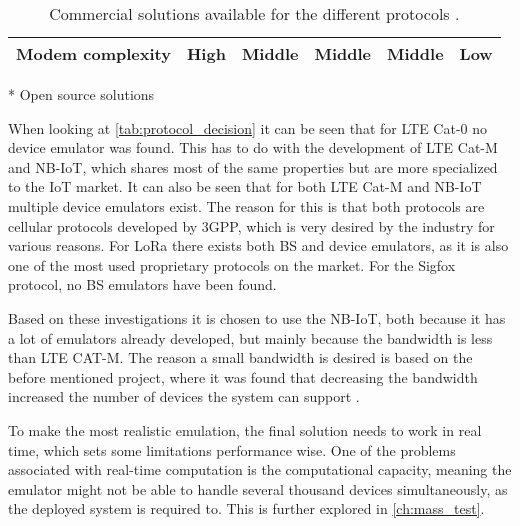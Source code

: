 \begin{table}[H]
{\begin{tabular}{|c|c|c|c|c|c|}
Modem complexity    & High                 & Middle                 & Middle             & Middle         & Low                \\ \hline
\end{tabular}}
\raggedright \scriptsize{ * Open source solutions} 
\caption{Commercial solutions available for the different protocols \citep{UE_list, Amarisoft_solutions, SRS_solutions, LORA_solutions, Things_solutions, Mira_solutions, Telit_solutions, telefonicaid_solutions, murata_solutions}.}%
\label{tab:protocol_decision}
\end{table}


When looking at \autoref{tab:protocol_decision} it can be seen that for \gls{LTE} Cat-0 no device emulator was found. This has to do with the development of \gls{LTE} Cat-M and \gls{NB-IoT}, which shares most of the same properties but are more specialized to the \gls{IoT} market. It can also be seen that for both \gls{LTE} Cat-M and \gls{NB-IoT} multiple device emulators exist. The reason for this is that both protocols are cellular protocols developed by \gls{3GPP}, which is very desired by the industry for various reasons. For \gls{LoRa} there exists both  \gls{BS} and device emulators, as it is also one of the most used proprietary protocols on the market. For the Sigfox protocol, no \gls{BS} emulators have been found. 

Based on these investigations it is chosen to use the \gls{NB-IoT}, both because it has a lot of emulators already developed, but mainly because the bandwidth is less than LTE CAT-M. The reason a small bandwidth is desired is based on the before mentioned project, where it was found that decreasing the bandwidth increased the number of devices the system can support \citep{thesis_report}. 


To make the most realistic emulation, the final solution needs to work in real time, which sets some limitations performance wise. One of the problems associated with real-time computation is the computational capacity, meaning the emulator might not be able to handle several thousand devices simultaneously, as the deployed system is required to. This is further explored in \autoref{ch:mass_test}.

